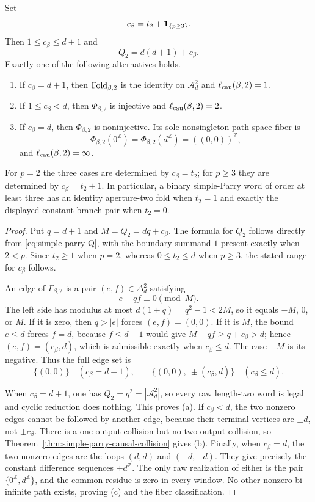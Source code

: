 \begin{theorem}
\label{thm:simple-parry-aperture-two}
Set
\[
c_\beta=t_2+\mathbf{1}_{\{p\ge3\}}.
\]
Then $1\le c_\beta\le d+1$ and
\[
Q_2=d(d+1)+c_\beta.
\]
Exactly one of the following alternatives holds.
\begin{enumerate}[label=\textup{(\alph*)}]
  \item If $c_\beta=d+1$, then $\mathrm{Fold}_{\beta,2}$ is the identity on
  $\mathcal A_d^2$ and $\ell_{\rm cau}(\beta,2)=1$.
  \item If $1\le c_\beta<d$, then $\Phi_{\beta,2}$ is injective and
  $\ell_{\rm cau}(\beta,2)=2$.
  \item If $c_\beta=d$, then $\Phi_{\beta,2}$ is noninjective.  Its sole
  nonsingleton path-space fiber is
  \[
  \Phi_{\beta,2}(0^{\mathbb Z})
  =\Phi_{\beta,2}(d^{\mathbb Z})
  =((0,0))^{\mathbb Z},
  \]
  and $\ell_{\rm cau}(\beta,2)=\infty$.
\end{enumerate}
For $p=2$ the three cases are determined by $c_\beta=t_2$; for
$p\ge3$ they are determined by $c_\beta=t_2+1$.  In particular, a binary
simple-Parry word of order at least three has an identity aperture-two fold
when $t_2=1$ and exactly the displayed constant branch pair when $t_2=0$.
\end{theorem}

\begin{proof}
Put $q=d+1$ and $M=Q_2=dq+c_\beta$.  The formula for $Q_2$ follows directly
from \eqref{eq:simple-parry-Q}, with the boundary summand $1$ present exactly
when $2<p$.  Since $t_2\ge1$ when $p=2$, whereas $0\le t_2\le d$ when
$p\ge3$, the stated range for $c_\beta$ follows.

An edge of $\Gamma_{\beta,2}$ is a pair $(e,f)\in\Delta_d^2$ satisfying
\begin{equation}
e+qf\equiv0\pmod M.
\label{eq:aperture-two-edge-congruence}
\end{equation}
The left side has modulus at most
$d(1+q)=q^2-1<2M$, so it equals $-M$, $0$, or $M$.  If it is zero, then
$q>|e|$ forces $(e,f)=(0,0)$.  If it is $M$, the bound $e\le d$ forces
$f=d$, because $f\le d-1$ would give
$M-qf\ge q+c_\beta>d$; hence $(e,f)=(c_\beta,d)$, which is admissible
exactly when $c_\beta\le d$.  The case $-M$ is its negative.  Thus the full
edge set is
\[
\{(0,0)\}\quad(c_\beta=d+1),
\qquad
\{(0,0),\ \pm(c_\beta,d)\}\quad(c_\beta\le d).
\]

When $c_\beta=d+1$, one has $Q_2=q^2=|\mathcal A_d^2|$, so every raw
length-two word is legal and cyclic reduction does nothing.  This proves
(a).  If $c_\beta<d$, the two nonzero edges cannot be followed by another
edge, because their terminal vertices are $\pm d$, not $\pm c_\beta$.
There is a one-output collision but no two-output collision, so
Theorem~\ref{thm:simple-parry-causal-collision} gives (b).  Finally, when
$c_\beta=d$, the two nonzero edges are the loops $(d,d)$ and $(-d,-d)$.
They give precisely the constant difference sequences $\pm d^{\mathbb Z}$.
The only raw realization of either is the pair
$\{0^{\mathbb Z},d^{\mathbb Z}\}$, and the common residue is zero in every
window.  No other nonzero bi-infinite path exists, proving (c) and the fiber
classification.
\end{proof}


